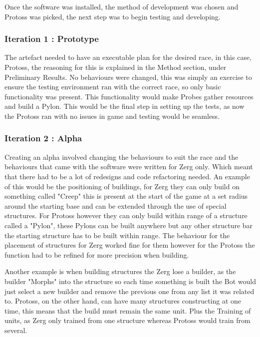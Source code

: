 \documentclass[journal]{IEEEtran}
\begin{document}
	Once the software was installed, the method of development was chosen and Protoss was picked, the next step was to begin testing and developing. 
	\newline
	
	\subsubsection{Iteration 1 : Prototype}
	The artefact needed to have an executable plan for the desired race, in this case, Protoss, the reasoning for this is explained in the Method section, under Preliminary Results. No behaviours were changed, this was simply an exercise to ensure the testing environment ran with the correct race, so only basic functionality was present. This functionality would make Probes gather resources and build a Pylon. This would be the final step in setting up the tests, as now the Protoss ran with no issues in game and testing would be seamless.
	\newline
	
	\subsubsection{Iteration 2 : Alpha}
	Creating an alpha involved changing the behaviours to suit the race and the behaviours that came with the software were written for Zerg only. Which meant that there had to be a lot of redesigns and code refactoring needed. An example of this would be the positioning of buildings, for Zerg they can only build on something called "Creep" this is present at the start of the game at a set radius around the starting base and can be extended through the use of special structures. For Protoss however they can only build within range of a structure called a "Pylon", these Pylons can be built anywhere but any other structure bar the starting structure has to be built within range. The behaviour for the placement of structures for Zerg worked fine for them however for the Protoss the function had to be refined for more precision when building. 
	
	Another example is when building structures the Zerg lose a builder, as the builder "Morphs" into the structure so each time something is built the Bot would just select a new builder and remove the previous one from any list it was related to. Protoss, on the other hand, can have many structures constructing at one time, this means that the build must remain the same unit. Plus the Training of units, as Zerg only trained from one structure whereas Protoss would train from several.
	
\end{document}
